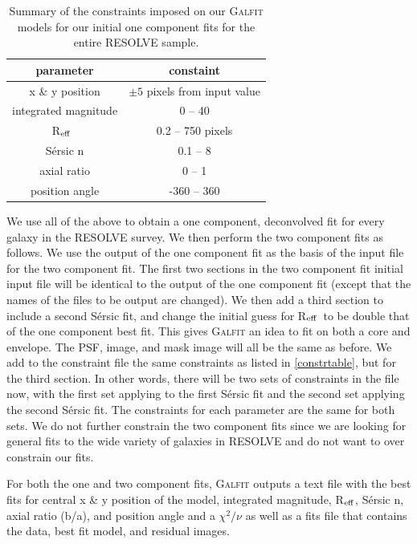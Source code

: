 \documentclass[iop,apj]{emulateapj}
\newcommand{\Reff}{R$_{\rm eff}$}
\begin{document}
\begin{table}[htdp]
\begin{center}
\begin{tabular}{cc} \hline
parameter & constaint  \\ \hline
x \& y position & $\pm5$ pixels from input value \\
integrated magnitude & 0 -- 40 \\ 
\Reff\ & 0.2 -- 750 pixels \\ 
S\'ersic n & 0.1 -- 8 \\ 
axial ratio & 0 -- 1 \\
position angle & -360 -- 360 \\ \hline
\end{tabular}
\end{center}
\caption{Summary of the constraints imposed on our \textsc{Galfit} models for our initial one component fits for the entire RESOLVE sample.}
\label{constrtable}
\end{table}%

\noindent We use all of the above to obtain a one component, deconvolved fit for every galaxy in the RESOLVE survey. We then perform the two component fits as follows. We use the output of the one component fit as the basis of the input file for the two component fit. The first two sections in the two component fit initial input file will be identical to the output of the one component fit (except that the names of the files to be output are changed). We then add a third section to include a second S\'ersic fit, and change the initial guess for \Reff\ to be double that of the one component best fit. This gives \textsc{Galfit} an idea to fit on both a core and envelope. The PSF, image, and mask image will all be the same as before. We add to the constraint file the same constraints as listed in \autoref{constrtable}, but for the third section. In other words, there will be two sets of constraints in the file now, with the first set applying to the first S\'ersic fit and the second set applying the second S\'ersic fit. The constraints for each parameter are the same for both sets. We do not further constrain the two component fits since we are looking for general fits to the wide variety of galaxies in RESOLVE and do not want to over constrain our fits.

For both the one and two component fits, \textsc{Galfit} outputs a text file with the best fits for central x \& y position of the model, integrated magnitude, \Reff, S\'ersic n, axial ratio (b/a), and position angle and a $\chi^2/\nu$ as well as a fits file that contains the data, best fit model, and residual images.
\end{document}
